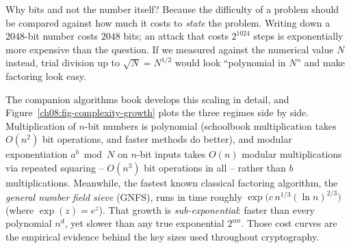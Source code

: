 \begin{intuitionbox}
Why bits and not the number itself? Because the difficulty of a problem should be compared against how much it costs to \emph{state} the problem. Writing down a $2048$-bit number costs $2048$ bits; an attack that costs $2^{1024}$ steps is exponentially more expensive than the question. If we measured against the numerical value $N$ instead, trial division up to $\sqrt{N} = N^{1/2}$ would look ``polynomial in $N$'' and make factoring look easy.
\end{intuitionbox}

\begin{connectionbox}
The companion algorithms book develops this scaling in detail, and Figure~\ref{ch08:fig-complexity-growth} plots the three regimes side by side. Multiplication of $n$-bit numbers is polynomial (schoolbook multiplication takes $O(n^2)$ bit operations, and faster methods do better), and modular exponentiation $a^b \bmod N$ on $n$-bit inputs takes $O(n)$ modular multiplications via repeated squaring -- $O(n^3)$ bit operations in all -- rather than $b$ multiplications. Meanwhile, the fastest known classical factoring algorithm, the \emph{general number field sieve} (GNFS), runs in time roughly $\exp\!\bigl(c\,n^{1/3}(\ln n)^{2/3}\bigr)$ (where $\exp(z) = e^{z}$). That growth is \emph{sub-exponential}: faster than every polynomial $n^{d}$, yet slower than any true exponential $2^{\alpha n}$. Those cost curves are the empirical evidence behind the key sizes used throughout cryptography.
\end{connectionbox}

